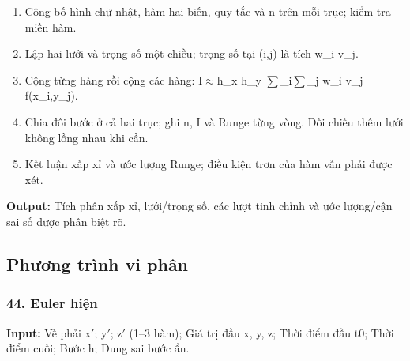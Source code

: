 \begin{enumerate}

\item Công bố hình chữ nhật,\allowbreak{} hàm hai biến,\allowbreak{} quy tắc và n trên mỗi trục;\allowbreak{} kiểm tra miền hàm.

\item Lập hai lưới và trọng số một chiều;\allowbreak{} trọng số tại (\allowbreak{}i,\allowbreak{}j) là tích w\_i v\_j.

\item Cộng từng hàng rồi cộng các hàng: I\ensuremath{\approx}h\_x h\_y \ensuremath{\sum}\_i\ensuremath{\sum}\_j w\_i v\_j f(\allowbreak{}x\_i,\allowbreak{}y\_j).

\item Chia đôi bước ở cả hai trục;\allowbreak{} ghi n,\allowbreak{} I và Runge từng vòng. Đối chiếu thêm lưới không lồng nhau khi cần.

\item Kết luận xấp xỉ và ước lượng Runge;\allowbreak{} điều kiện trơn của hàm vẫn phải được xét.

\end{enumerate}

\textbf{Output:} Tích phân xấp xỉ,\allowbreak{} lưới/\allowbreak{}trọng số,\allowbreak{} các lượt tinh chỉnh và ước lượng/\allowbreak{}cận sai số được phân biệt rõ.

\subsection{Phương trình vi phân}

\examplebreak\subsubsection*{44. Euler hiện}

\textbf{Input:} Vế phải x\ensuremath{\prime};\allowbreak{} y\ensuremath{\prime};\allowbreak{} z\ensuremath{\prime} (\allowbreak{}1–3 hàm);\allowbreak{} Giá trị đầu x,\allowbreak{} y,\allowbreak{} z;\allowbreak{} Thời điểm đầu t0;\allowbreak{} Thời điểm cuối;\allowbreak{} Bước h;\allowbreak{} Dung sai bước ẩn.

